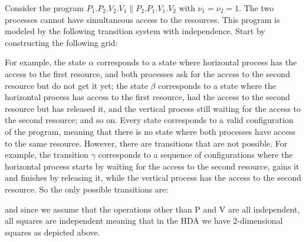 Consider the program $P_1.P_2.V_2.V_1\parallel P_2.P_1.V_1.V_2$ with $\nu_1 = \nu_2 = 1$. The two processes cannot have simultaneous access to the resources. This program is modeled by the following transition system with independence. Start by constructing the following grid:
				\begin{figure}[H]
					\begin{center}
    						
  					\end{center}
				\end{figure}
For example, the state $\alpha$ corresponds to a state where horizontal process has the access to the first resource, and both processes ask for the access to the second resource but do not get it yet; the state $\beta$ corresponds to a state where the horizontal process has access to the first resource, had the access to the second resource but has released it, and the vertical process still waiting for the access to the second resource; and so on. Every state corresponds to a valid configuration of the program, meaning that there is no state where both processes have access to the same resource. However, there are transitions that are not possible. For example, the transition $\gamma$ corresponds to a sequence of configurations where the horizontal process starts by waiting for the access to the second resource, gains it and finishes by releasing it, while the vertical process has the access to the second resource. So the only possible transitions are:
				\begin{figure}[H]
					\begin{center}
    						
  					\end{center}
				\end{figure}
\noindent and since we assume that the operations other than P and V are all independent, all squares are independent meaning that in the HDA we have 2-dimensional squares as depicted above.




